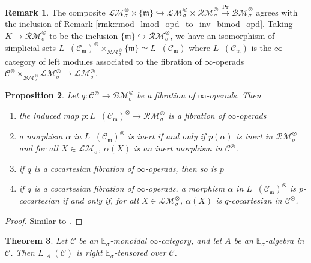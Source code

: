 \documentclass{article}
\DeclareMathOperator{\Modh}{{}^{\sigma}Mod} %
\newcommand{\EE}{\mathbb{E}}
\newtheorem{theorem}{Theorem}[section]
\newtheorem{proposition}[theorem]{Proposition}
\theoremstyle{definition}
\newtheorem{remark}[theorem]{Remark}
\begin{document}
\begin{remark}
   The composite $ \mathcal{LM}^\otimes_\sigma \times \{\mathfrak{m}\} \hookrightarrow \mathcal{LM}^\otimes_\sigma \times \mathcal{RM}^\otimes_\sigma \xrightarrow{\mathrm{Pr}} \mathcal{BM}^\otimes_\sigma $ agrees with the inclusion of Remark \ref{rmk:rmod_lmod_opd_to_inv_bimod_opd}. 
   Taking $ K \to \mathcal{RM}^\otimes_\sigma $ to be the inclusion $ \{\mathfrak{m}\} \hookrightarrow \mathcal{RM}^\otimes_\sigma $, we have an isomorphism of simplicial sets $ L\Modh(\mathcal{C}_{\mathfrak{m}})^\otimes \times_{\mathcal{RM}^\otimes_\sigma} \{\mathfrak{m}\} \simeq L\Modh(\mathcal{C}_{\mathfrak{m}}) $ where $ L\Modh(\mathcal{C}_{\mathfrak{m}}) $ is the $ \infty $-category of left modules associated to the fibration of $ \infty $-operads $ \mathcal{C}^\otimes \times_{\mathcal{BM}^\otimes_{\sigma}} \mathcal{LM}^\otimes_\sigma \to \mathcal{LM}^\otimes_\sigma $. 
\end{remark} 
\begin{proposition}
    Let $ q \colon \mathcal{C}^\otimes \to \mathcal{BM}^\otimes_\sigma $ be a fibration of $ \infty $-operads. Then
    \begin{enumerate}[label=(\arabic*)]
        \item the induced map $ p \colon L\Modh(\mathcal{C}_{\mathfrak{m}})^\otimes \to \mathcal{RM}^\otimes_\sigma $ is a fibration of $ \infty $-operads 
        \item a morphism $ \alpha $ in $ L\Modh(\mathcal{C}_{\mathfrak{m}})^\otimes $ is inert if and only if $ p (\alpha) $ is inert in $ \mathcal{RM}^\otimes_\sigma $ and for all $ X \in \mathcal{LM}_\sigma $, $ \alpha(X) $ is an inert morphism in $ \mathcal{C}^\otimes $. 
        \item if $ q $ is a cocartesian fibration of $ \infty $-operads, then so is $ p $
        \item if $ q $ is a cocartesian fibration of $ \infty $-operads, a morphism $ \alpha $ in $ L\Modh(\mathcal{C}_{\mathfrak{m}})^\otimes $ is $ p $-cocartesian if and only if, for all $ X \in \mathcal{LM}^\otimes_\sigma $, $ \alpha(X) $ is $ q $-cocartesian in $ \mathcal{C}^\otimes $. 
    \end{enumerate}
\end{proposition}
\begin{proof}
    Similar to \cite[Proposition 4.3.2.5]{LurHA}.    
\end{proof}
\begin{theorem}
    Let $ \mathcal{C} $ be an $ \EE_\sigma $-monoidal $ \infty $-category, and let $ A $ be an $ \EE_\sigma $-algebra in $ \mathcal{C} $. 
    Then $ L\Modh_A(\mathcal{C}) $ is right $ \EE_\sigma $-tensored over $ \mathcal{C} $. 
\end{theorem}
\end{document}
